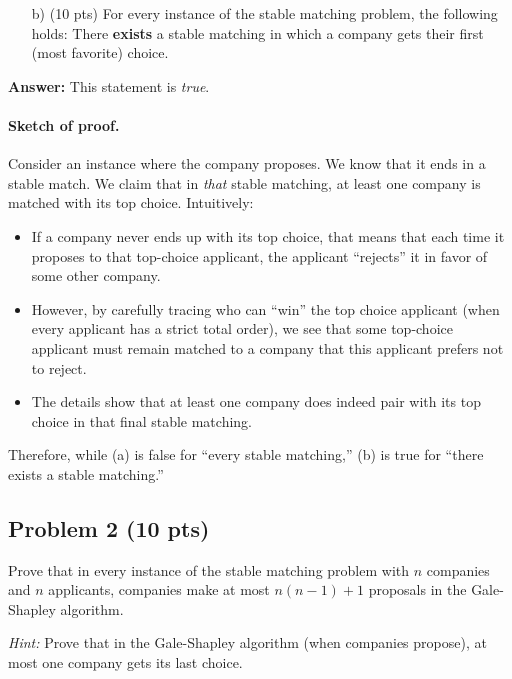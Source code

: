 \documentclass[12pt]{article}
\begin{document}
\begin{enumerate}
    
    \item[b)] (10 pts) For every instance of the stable matching problem, the following holds: There \textbf{exists} a stable matching in which a company gets their first (most favorite) choice.
\end{enumerate}

\noindent \textbf{Answer:}
This statement is \emph{true}.

\paragraph{Sketch of proof.}
Consider an instance where the company proposes. We know that it ends in a stable match. We claim that in \emph{that} stable matching, at least one company is matched with its top choice. Intuitively:
\begin{itemize}
    \item If a company never ends up with its top choice, that means that each time it proposes to that top-choice applicant, the applicant ``rejects'' it in favor of some other company. 
    \item However, by carefully tracing who can ``win'' the top choice applicant (when every applicant has a strict total order), we see that some top-choice applicant must remain matched to a company that this applicant prefers not to reject. 
    \item The details show that at least one company does indeed pair with its top choice in that final stable matching.
\end{itemize}

Therefore, while (a) is false for ``every stable matching,'' (b) is true for ``there exists a stable matching.''

\subsection*{Problem 2 (10 pts)}

Prove that in every instance of the stable matching problem with $n$ companies and $n$ applicants, companies make at most $n(n-1)+1$ proposals in the Gale-Shapley algorithm.

\textit{Hint:} Prove that in the Gale-Shapley algorithm (when companies propose), at most one company gets its last choice.
\end{document}
